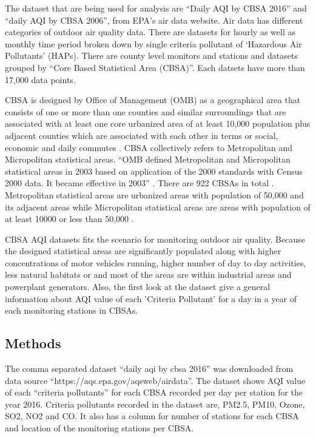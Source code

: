 \documentclass[sigconf]{acmart}
\begin{document}
   The dataset that are being used for analysis are ``Daily AQI by CBSA 2016'' and ``daily AQI by CBSA 2006'', from EPA's air data website. Air data has different categories of outdoor air quality data. There are datasets for hourly as well as monthly time period broken down by single criteria pollutant of `Hazardous Air Pollutants' (HAPs). There are county level monitors and stations and datasets grouped by ``Core Based Statistical Area (CBSA)''. Each datsets have more than 17,000 data points. 

   CBSA is designed by Office of Management (OMB) as a geographical area that consists of one or more than one counties and similar surroundings that are associated with at least one core urbanized area of at least 10,000 population plus adjacent counties which are associated with each other in terms or social, economic and daily commutes \cite{www-census-gov}. CBSA collectively refers to Metropolitan and Micropolitan statistical areas. ``OMB defined Metropolitan and Micropolitan statistical areas in 2003 based on application of the 2000 standards with Census 2000 data. It became effective in 2003'' \cite{www-census-gov}. There are 922 CBSAs in total \cite{www-census-gov}. Metropolitan statistical areas are urbanized areas with population of 50,000 and its adjacent areas  while Micropolitan statistical areas are areas with population of at least 10000 or less than 50,000 \cite{www-census-gov}. 

   CBSA AQI datasets fits the scenario for monitoring outdoor air quality. Because the designed statistical areas are significantly populated along with higher concentrations of motor vehicles running, higher number of day to day activities, less natural habitats or and most of the areas are within industrial areas and powerplant generators. Also, the first look at the dataset give a general information about AQI value of each 'Criteria Pollutant' for a day in a year of each monitoring stations in CBSAs. 

\subsection{Methods}
   The comma separated dataset ``daily aqi by cbsa 2016'' was downloaded from data source ``https://aqs.epa.gov/aqsweb/airdata''. The dataset shows AQI value of each ``criteria pollutants'' for each CBSA recorded per day per station for the year 2016. Criteria pollutants recorded in the dataset are, PM2.5, PM10, Ozone, SO2, NO2 and CO. It also has a column for number of stations for each CBSA and location of the monitoring stations per CBSA. 
\end{document}
